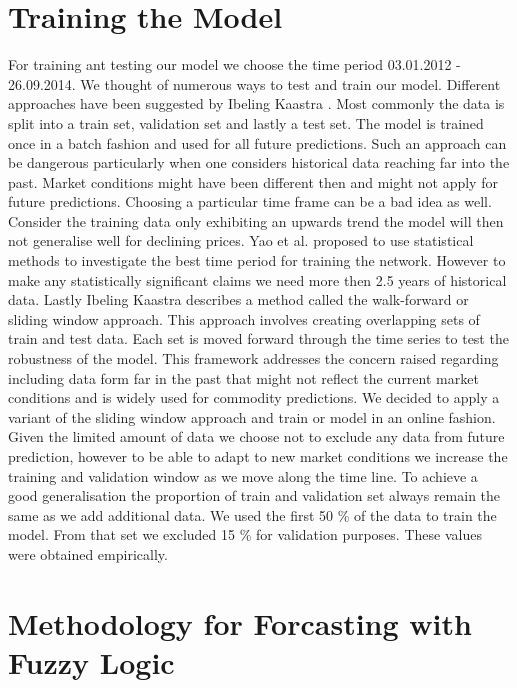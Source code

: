 \section{Training the Model}

For training ant testing our model we choose the time period 03.01.2012 - 26.09.2014. We thought of numerous ways to test and train our model. Different approaches have been suggested by Ibeling Kaastra \cite{Kaastra96designinga}. Most commonly the data is split into a train set, validation set and lastly a test set. The model is trained once in a batch fashion and used for all future predictions. Such an approach can be dangerous particularly when one considers historical data reaching far into the past. Market conditions might have been different then and might not apply for future predictions. Choosing a particular time frame can be a bad idea as well. Consider the training data only exhibiting an upwards trend the model will then not generalise well for declining prices. Yao et al. \cite{Yao00acase} proposed to use statistical methods to investigate the best time period for training the network. However to make any statistically significant claims we need more then 2.5 years of historical data. Lastly Ibeling Kaastra describes a method called the walk-forward or sliding window approach. This approach involves creating overlapping sets of train and test data. Each set is moved forward through the time series to test the robustness of the model. This framework addresses the concern raised regarding including data form far in the past that might not reflect the current market conditions and is widely used for commodity predictions. We decided to apply a variant of the sliding window approach and train or model in an online fashion. Given the limited amount of data we choose not to exclude any data from future prediction, however to be able to adapt to new market conditions we increase the training and validation window as we move along the time line. To achieve a good generalisation the proportion of train and validation set always remain the same as we add additional data. We used the first 50 \% of the data to train the model. From that set we excluded 15 \% for validation purposes. These values were obtained empirically. 



\section{Methodology for Forcasting with Fuzzy Logic}

